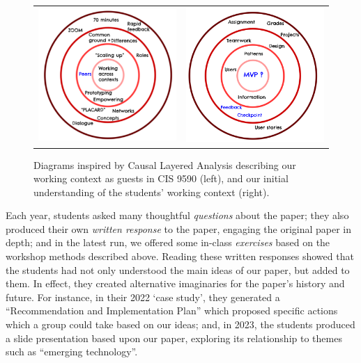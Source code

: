 \documentclass[acmlarge,timestamp]{acmart}
\begin{document}
\begin{figure}[h]
  \begin{tabular}{cc}
    \includegraphics[width=.45\textwidth]{UsCLA.png} &
    \includegraphics[width=.45\textwidth]{ThemCLA.png}
  \end{tabular}
\caption{Diagrams inspired by Causal Layered Analysis describing our working context as guests in CIS 9590 (left), and our initial understanding of the students’ working context (right).\label{cis-9590-anticipations}}
\end{figure}

Each year, students asked many thoughtful \emph{questions} about the
paper; they also produced their own \emph{written response} to the
paper, engaging the original paper in depth; and in the latest run, we
offered some in-class \emph{exercises} based on the workshop methods
described above.  Reading these written responses showed that the
students had not only understood the main ideas of our paper, but
added to them.  In effect, they created alternative imaginaries for
the paper’s history and future.  For instance, in their 2022 ‘case
study’, they generated a “Recommendation and Implementation Plan”
which proposed specific actions which a group could take based on our
ideas; and, in 2023, the students produced a slide presentation based
upon our paper, exploring its relationship to themes such as “emerging
technology”.
\end{document}
